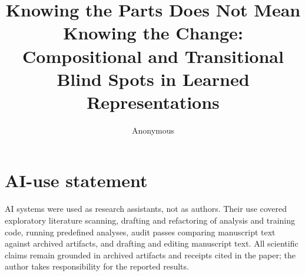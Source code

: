 \documentclass{article} %
\title{Knowing the Parts Does Not Mean Knowing the Change:
Compositional and Transitional Blind Spots in Learned Representations}
\author{Anonymous}
\begin{document}
\maketitle

\begin{abstract}

\end{abstract}





\appendix


\section*{AI-use statement}
AI systems were used as research assistants, not as authors. Their use covered
exploratory literature scanning, drafting and refactoring of analysis and training
code, running predefined analyses, audit passes comparing manuscript text against
archived artifacts, and drafting and editing manuscript text. All scientific claims
remain grounded in archived artifacts and receipts cited in the paper; the author
takes responsibility for the reported results.
\end{document}
